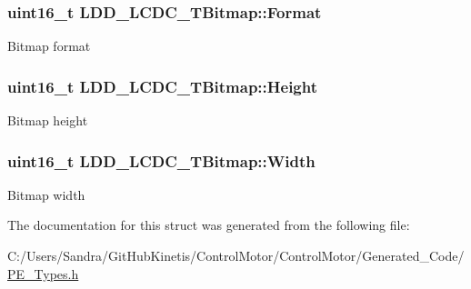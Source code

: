 \subsubsection[{\texorpdfstring{Format}{Format}}]{\setlength{\rightskip}{0pt plus 5cm}uint16\+\_\+t L\+D\+D\+\_\+\+L\+C\+D\+C\+\_\+\+T\+Bitmap\+::\+Format}\hypertarget{struct_l_d_d___l_c_d_c___t_bitmap_a8f886a6ce6e67d4b070c20bdd5ce495a}{}\label{struct_l_d_d___l_c_d_c___t_bitmap_a8f886a6ce6e67d4b070c20bdd5ce495a}
Bitmap format 
\subsubsection[{\texorpdfstring{Height}{Height}}]{\setlength{\rightskip}{0pt plus 5cm}uint16\+\_\+t L\+D\+D\+\_\+\+L\+C\+D\+C\+\_\+\+T\+Bitmap\+::\+Height}\hypertarget{struct_l_d_d___l_c_d_c___t_bitmap_a13fea31674709c4f681e6c86d3b71206}{}\label{struct_l_d_d___l_c_d_c___t_bitmap_a13fea31674709c4f681e6c86d3b71206}
Bitmap height 
\subsubsection[{\texorpdfstring{Width}{Width}}]{\setlength{\rightskip}{0pt plus 5cm}uint16\+\_\+t L\+D\+D\+\_\+\+L\+C\+D\+C\+\_\+\+T\+Bitmap\+::\+Width}\hypertarget{struct_l_d_d___l_c_d_c___t_bitmap_af88017bd29e49292265c1fda6dc5463d}{}\label{struct_l_d_d___l_c_d_c___t_bitmap_af88017bd29e49292265c1fda6dc5463d}
Bitmap width 

The documentation for this struct was generated from the following file\+:\begin{DoxyCompactItemize}
\item 
C\+:/\+Users/\+Sandra/\+Git\+Hub\+Kinetis/\+Control\+Motor/\+Control\+Motor/\+Generated\+\_\+\+Code/\hyperlink{_p_e___types_8h}{P\+E\+\_\+\+Types.\+h}\end{DoxyCompactItemize}
